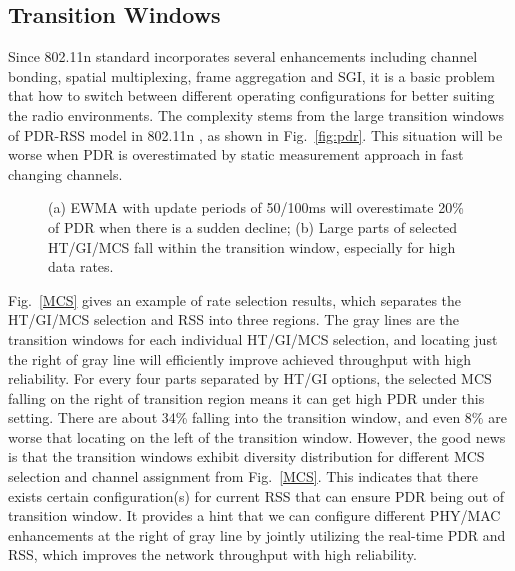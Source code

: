 \documentclass[draftclsnofoot,journal,onecolumn,11pt]{IEEEtran}
\begin{document}
\subsection{Transition Windows}
Since 802.11n standard incorporates several enhancements including channel bonding, spatial multiplexing, frame aggregation and SGI, it is a basic problem that how to switch between different operating configurations for better suiting the radio environments. The complexity stems from the large transition windows of PDR-RSS model in 802.11n \cite{Halperin2010predictable}, as shown in Fig.~\ref{fig:pdr}. This situation will be worse when PDR is overestimated by static measurement approach in fast changing channels.

\begin{figure}[!htp]
\centerline{
}
\caption{(a) EWMA with update periods of 50/100ms will overestimate 20\% of PDR when there is a sudden decline; (b) Large parts of selected HT/GI/MCS fall within the transition window, especially for high data rates.}
\label{pdr-rss}
\end{figure}

Fig.~\ref{MCS} gives an example of rate selection results, which separates the HT/GI/MCS selection and RSS into three regions. The gray lines are the transition windows for each individual HT/GI/MCS selection, and locating just the right of gray line will efficiently improve achieved throughput with high reliability. For every four parts separated by HT/GI options, the selected MCS falling on the right of transition region means it can get high PDR under this setting. There are about 34\% falling into the transition window, and even 8\% are worse that locating on the left of the transition window. However, the good news is that the transition windows exhibit diversity distribution for different MCS selection and channel assignment from Fig.~\ref{MCS}. This indicates that there exists certain configuration(s) for current RSS that can ensure PDR being out of transition window. It provides a hint that we can configure different PHY/MAC enhancements at the right of gray line by jointly utilizing the real-time PDR and RSS, which improves the network throughput with high reliability.
\end{document}
